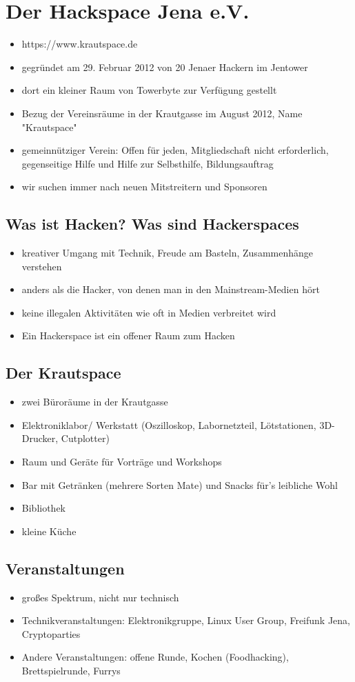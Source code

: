 \documentclass[a4paper,12pt,twoside]{article}
\newcommand{\itemlinespace}{\setlength{\itemsep}{1pt}}
\begin{document}
\thispagestyle{empty}
\section*{Der Hackspace Jena e.V.}
\begin{itemize}
\itemlinespace{}
\item https://www.krautspace.de
\item gegründet am 29. Februar 2012 von 20 Jenaer Hackern im Jentower
\item dort ein kleiner Raum von Towerbyte zur Verfügung gestellt
\item Bezug der Vereinsräume in der Krautgasse im August 2012, Name "Krautspace"
\item gemeinnütziger Verein: Offen für jeden, Mitgliedschaft nicht erforderlich, gegenseitige Hilfe und Hilfe zur Selbsthilfe, Bildungsauftrag
\item wir suchen immer nach neuen Mitstreitern und Sponsoren
\end{itemize}
\subsection*{Was ist Hacken? Was sind Hackerspaces}
\begin{itemize}
\itemlinespace{}
\item kreativer Umgang mit Technik, Freude am Basteln, Zusammenhänge verstehen
\item anders als die Hacker, von denen man in den Mainstream-Medien hört
\item keine illegalen Aktivitäten wie oft in Medien verbreitet wird
\item Ein Hackerspace ist ein offener Raum zum Hacken
\end{itemize}
\subsection*{Der Krautspace}
\begin{itemize}
\itemlinespace{}
\item zwei Büroräume in der Krautgasse
\item Elektroniklabor/ Werkstatt (Oszilloskop, Labornetzteil, Lötstationen, 3D-Drucker, Cutplotter)
\item Raum und Geräte für Vorträge und Workshops
\item Bar mit Getränken (mehrere Sorten Mate) und Snacks für's leibliche Wohl
\item Bibliothek
\item kleine Küche
\end{itemize}
\subsection*{Veranstaltungen}
\begin{itemize}
\itemlinespace{}
\item großes Spektrum, nicht nur technisch
\item Technikveranstaltungen: Elektronikgruppe, Linux User Group, Freifunk Jena, Cryptoparties
\item Andere Veranstaltungen: offene Runde, Kochen (Foodhacking), Brettspielrunde,  Furrys
\end{itemize}
\end{document}
